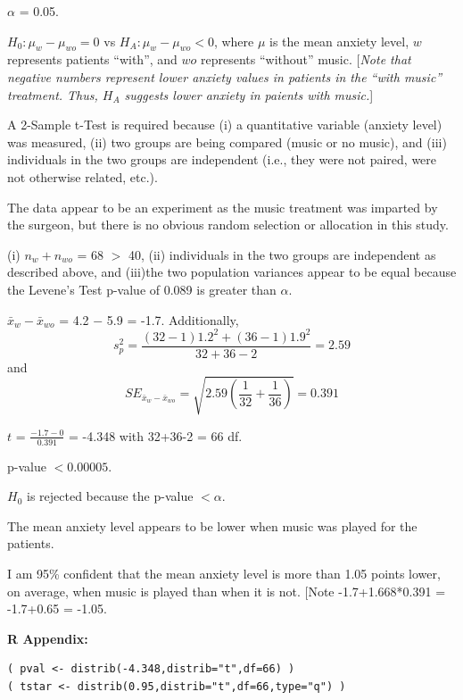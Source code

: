 \documentclass[10pt,openany]{book}\usepackage[]{graphicx}\usepackage[]{color}
\makeatletter
\newenvironment{kframe}{%
 \def\at@end@of@kframe{}%
 \ifinner\ifhmode%
  \def\at@end@of@kframe{\end{minipage}}%
  \begin{minipage}{\columnwidth}%
 \fi\fi%
 \def\FrameCommand##1{\hskip\@totalleftmargin \hskip-\fboxsep
 \colorbox{shadecolor}{##1}\hskip-\fboxsep
     \hskip-\linewidth \hskip-\@totalleftmargin \hskip\columnwidth}%
 \MakeFramed {\advance\hsize-\width
   \@totalleftmargin\z@ \linewidth\hsize
   \@setminipage}}%
 {\par\unskip\endMakeFramed%
 \at@end@of@kframe}
\newenvironment{knitrout}{}{} %
\makeatother
\begin{document}
\begin{Enumerate}
  \item $\alpha$ = 0.05.
  \item $H_{0}:\mu_{w}-\mu_{wo} = 0$ vs $H_{A}:\mu_{w}-\mu_{wo}<0$, where $\mu$ is the mean anxiety level, $w$ represents patients ``with'', and $wo$ represents ``without'' music. [\textit{Note that negative numbers represent lower anxiety values in patients in the ``with music'' treatment. Thus, $H_{A}$ suggests lower anxiety in paients with music.}]
  \item A 2-Sample t-Test is required because (i) a quantitative variable (anxiety level) was measured, (ii) two groups are being compared (music or no music), and (iii) individuals in the two groups are independent (i.e., they were not paired, were not otherwise related, etc.).
  \item The data appear to be an experiment as the music treatment was imparted by the surgeon, but there is no obvious random selection or allocation in this study.
  \item (i) $n_{w}+n_{wo}$ = 68 $>$ 40, (ii) individuals in the two groups are independent as described above, and (iii)the two population variances appear to be equal because the Levene's Test p-value of 0.089 is greater than $\alpha$.
  \item $\bar{x}_{w}-\bar{x}_{wo}$ = 4.2 $-$ 5.9 = -1.7. Additionally,
    \[s_{p}^{2}=\frac{(32-1)1.2^{2}+(36-1)1.9^{2}}{32+36-2} = 2.59 \]
and
    \[ SE_{\bar{x}_{w}-\bar{x}_{wo}}=\sqrt{2.59\left(\frac{1}{32}+\frac{1}{36} \right)} = 0.391  \]
  \item $t$ = $\frac{-1.7-0}{0.391}$ = -4.348 with 32+36-2 = 66 df.
  \item p-value $<0.00005$.
  \item $H_{0}$ is rejected because the p-value $< \alpha$.
  \item The mean anxiety level appears to be lower when music was played for the patients.
  \item I am 95\% confident that the mean anxiety level is more than 1.05 points lower, on average, when music is played than when it is not. [Note -1.7+1.668*0.391 = -1.7+0.65 = -1.05.
\end{Enumerate}

\vspace{-8pt}
\begin{minipage}{\textwidth}
\textbf{R Appendix:}
\vspace*{-6pt}
\begin{knitrout}
\color{fgcolor}\begin{kframe}
\begin{verbatim}
( pval <- distrib(-4.348,distrib="t",df=66) )
( tstar <- distrib(0.95,distrib="t",df=66,type="q") )
\end{verbatim}
\end{kframe}
\end{knitrout}
\end{minipage}
\end{document}
